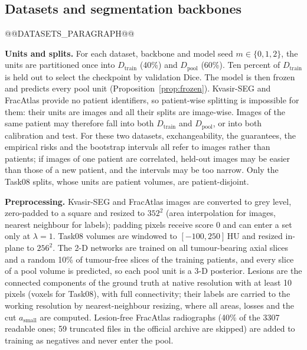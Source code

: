 \documentclass[sn-mathphys-num]{sn-jnl}%
\theoremstyle{thmstyleone}
\theoremstyle{thmstyletwo}
\theoremstyle{thmstylethree}
\newcommand{\1}{\mathbb{1}}
\begin{document}
\subsection{Datasets and segmentation backbones}\label{sec:data}

@@DATASETS_PARAGRAPH@@

\textbf{Units and splits.} For each dataset, backbone and model seed $m\in\{0,1,2\}$, the units are partitioned once into $D_{\mathrm{train}}$ (40\%) and $D_{\mathrm{pool}}$ (60\%). Ten percent of $D_{\mathrm{train}}$ is held out to select the checkpoint by validation Dice. The model is then frozen and predicts every pool unit (Proposition~\ref{prop:frozen}). Kvasir-SEG and FracAtlas provide no patient identifiers, so patient-wise splitting is impossible for them: their units are images and all their splits are image-wise. Images of the same patient may therefore fall into both $D_{\mathrm{train}}$ and $D_{\mathrm{pool}}$, or into both calibration and test. For these two datasets, exchangeability, the guarantees, the empirical risks and the bootstrap intervals all refer to images rather than patients; if images of one patient are correlated, held-out images may be easier than those of a new patient, and the intervals may be too narrow. Only the Task08 splits, whose units are patient volumes, are patient-disjoint.

\textbf{Preprocessing.} Kvasir-SEG and FracAtlas images are converted to grey level, zero-padded to a square and resized to $352^2$ (area interpolation for images, nearest neighbour for labels); padding pixels receive score 0 and can enter a set only at $\lambda=1$. Task08 volumes are windowed to $[-100,250]$\,HU and resized in-plane to $256^2$. The 2-D networks are trained on all tumour-bearing axial slices and a random 10\% of tumour-free slices of the training patients, and every slice of a pool volume is predicted, so each pool unit is a 3-D posterior. Lesions are the connected components of the ground truth at native resolution with at least 10 pixels (voxels for Task08), with full connectivity; their labels are carried to the working resolution by nearest-neighbour resizing, where all areas, losses and the cut $a_{\mathrm{small}}$ are computed. Lesion-free FracAtlas radiographs (40\% of the 3307 readable ones; 59 truncated files in the official archive are skipped) are added to training as negatives and never enter the pool.
\end{document}
